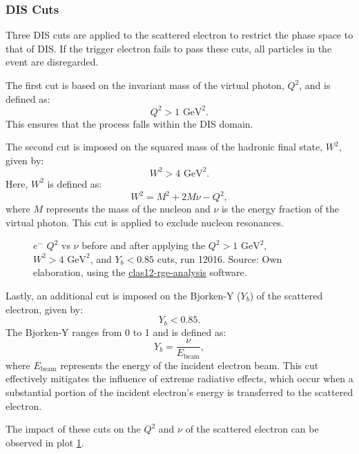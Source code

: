 \subsubsection{DIS Cuts}
\label{13.23::dis_cuts}
    Three DIS cuts are applied to the scattered electron to restrict the phase space to that of DIS.
    If the trigger electron fails to pass these cuts, all particles in the event are disregarded.

    The first cut is based on the invariant mass of the virtual photon, $Q^2$, and is defined as:
    \begin{equation*}
        Q^2 > 1 \text{ GeV}^2.
    \end{equation*}
    This ensures that the process falls within the DIS domain.

    The second cut is imposed on the squared mass of the hadronic final state, $W^2$, given by:
    \begin{equation*}
        W^2 > 4 \text{ GeV}^2.
    \end{equation*}
    Here, $W^2$ is defined as:
    \begin{equation*}
        W^2 = M^2 + 2M\nu - Q^2,
    \end{equation*}
    where $M$ represents the mass of the nucleon and $\nu$ is the energy fraction of the virtual photon.
    This cut is applied to exclude nucleon resonances.

    \begin{figure}[b!]
        \centering{}
        \caption[$Q^2$ vs $\nu$ comparison]{$e^-$ $Q^2$ vs $\nu$ before and after applying the $Q^2 > 1 \text{ GeV}^2$, $W^2 > 4 \text{ GeV}^2$, and $Y_b < 0.85$ cuts, run 12016.
        Source: Own elaboration, using the \href{https://github.com/bleaktwig/clas12-rge-analysis}{clas12-rge-analysis} software.}
        \label{fig::13.23::q2_vs_nu}
    \end{figure}

    Lastly, an additional cut is imposed on the Bjorken-Y ($Y_b$) of the scattered electron, given by:
    \begin{equation*}
        Y_b < 0.85.
    \end{equation*}
    The Bjorken-Y ranges from 0 to 1 and is defined as:
    \begin{equation*}
        Y_b = \frac{\nu}{E_\text{beam}},
    \end{equation*}
    where $E_\text{beam}$ represents the energy of the incident electron beam.
    This cut effectively mitigates the influence of extreme radiative effects, which occur when a substantial portion of the incident electron's energy is transferred to the scattered electron.

    The impact of these cuts on the $Q^2$ and $\nu$ of the scattered electron can be observed in plot \ref{fig::13.23::q2_vs_nu}.
